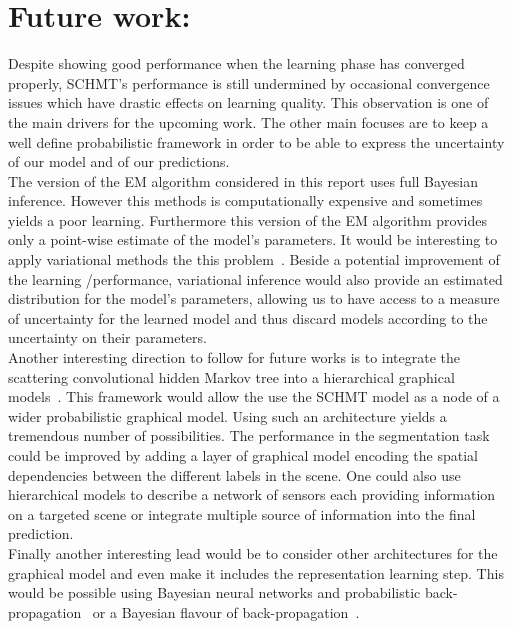 \documentclass[a4paper,11pt]{report}
\begin{document}
  \section{Future work:}
		Despite showing good performance when the learning phase has converged properly, SCHMT's performance is still undermined by occasional convergence issues which have drastic effects on learning quality. This observation is one of the main drivers for the upcoming work. The other main focuses are to keep a well define probabilistic framework in order to be able to express the uncertainty of our model and of our predictions.\\
		
		The version of the EM algorithm considered in this report uses full Bayesian inference. However this methods is computationally expensive and sometimes yields a poor learning. Furthermore this version of the EM algorithm provides only a point-wise estimate of the model's parameters. It would be interesting to apply variational methods the this problem~\citep{wainwright2008graphical}. Beside a potential improvement of the learning /performance, variational inference would also provide an estimated distribution for the model's parameters, allowing us to have access to a measure of uncertainty for the learned model and thus discard models according to the uncertainty on their parameters.\\
		
		Another interesting direction to follow for future works is to integrate the scattering convolutional hidden Markov tree into a hierarchical graphical models~\citep{fine1998hierarchical}. This framework would allow the use the SCHMT model as a node of a wider probabilistic graphical model. Using such an architecture yields a tremendous number of possibilities. The performance in the segmentation task could be improved by adding a layer of graphical model encoding the spatial dependencies between the different labels in the scene. One could also use hierarchical models to describe a network of sensors each providing information on a targeted scene or integrate multiple source of information into the final prediction.\\
		
		Finally another interesting lead would be to consider other architectures for the graphical model and even make it includes the representation learning step. This would be possible using Bayesian neural networks and probabilistic back-propagation~\citep{hernandez2015probabilistic} or a Bayesian flavour of back-propagation~\citep{blundell2015weight}.
    
\end{document}
